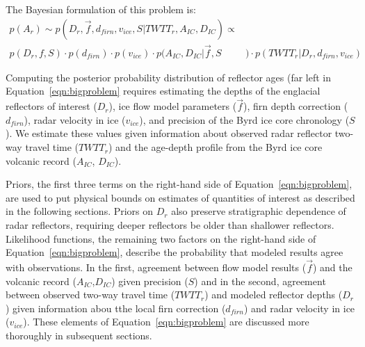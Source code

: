 
The Bayesian formulation of this problem is:
\begin{equation}\label{eqn:bigproblem}
\begin{split} %
p(A_r)  \sim  p(D_r,\vec{f},d_{firn},v_{ice},S | TWTT_r,A_{IC},D_{IC})  \propto & \\
 p(D_r,f,S) \cdot p(d_{firn})\cdot p(v_{ice}) \cdot p(A_{IC},D_{IC} | \vec{f},S&)    \cdot p(TWTT_r | D_r,d_{firn},v_{ice})
\end{split}
\end{equation}

Computing the posterior probability distribution of reflector ages (far left in Equation~\ref{eqn:bigproblem} requires estimating the depths of the englacial reflectors of interest ($D_r$), ice flow model parameters ($\vec{f}$), firn depth correction ($d_{firn}$), radar velocity in ice ($v_{ice}$), and precision of the Byrd ice core chronology ($S$). We estimate these values given information about observed radar reflector two-way travel time ($TWTT_r$) and the age-depth profile from the Byrd ice core volcanic record ($A_{IC}$, $D_{IC}$). 


Priors, the first three terms on the right-hand side of Equation~\ref{eqn:bigproblem}, are used to put physical bounds on estimates of quantities of interest as described in the following sections. Priors on ${D_r}$ also preserve stratigraphic dependence of radar reflectors, requiring deeper reflectors be older than shallower reflectors. Likelihood functions, the remaining two factors on the right-hand side of Equation~\ref{eqn:bigproblem}, describe the probability that modeled results agree with observations. In the first, agreement between flow model results ($\vec{f}$) and the volcanic record ($A_{IC}$,$D_{IC}$) given precision ($S$) and in the second, agreement between observed two-way travel time ($TWTT_r$) and modeled reflector depths ($D_r$) given information abou tthe local firn correction ($d_{firn}$) and radar velocity in ice ($v_{ice}$). These elements of Equation~\ref{eqn:bigproblem} are discussed more thoroughly in subsequent sections.

